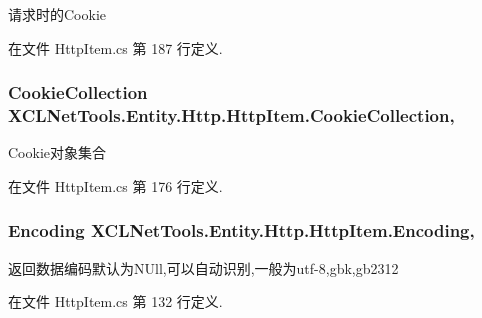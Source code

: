 请求时的\-Cookie 



在文件 Http\-Item.\-cs 第 187 行定义.

\hypertarget{class_x_c_l_net_tools_1_1_entity_1_1_http_1_1_http_item_a6130bb5eec4b2b63c195ee5ae2c9bbfd}{
\subsubsection[{Cookie\-Collection}]{\setlength{\rightskip}{0pt plus 5cm}Cookie\-Collection X\-C\-L\-Net\-Tools.\-Entity.\-Http.\-Http\-Item.\-Cookie\-Collection\hspace{0.3cm}{\ttfamily [get]}, {\ttfamily [set]}}}\label{class_x_c_l_net_tools_1_1_entity_1_1_http_1_1_http_item_a6130bb5eec4b2b63c195ee5ae2c9bbfd}


Cookie对象集合 



在文件 Http\-Item.\-cs 第 176 行定义.

\hypertarget{class_x_c_l_net_tools_1_1_entity_1_1_http_1_1_http_item_aefaad52c96c7c2b692f3470b61cd75eb}{
\subsubsection[{Encoding}]{\setlength{\rightskip}{0pt plus 5cm}Encoding X\-C\-L\-Net\-Tools.\-Entity.\-Http.\-Http\-Item.\-Encoding\hspace{0.3cm}{\ttfamily [get]}, {\ttfamily [set]}}}\label{class_x_c_l_net_tools_1_1_entity_1_1_http_1_1_http_item_aefaad52c96c7c2b692f3470b61cd75eb}


返回数据编码默认为\-N\-Ull,可以自动识别,一般为utf-\/8,gbk,gb2312 



在文件 Http\-Item.\-cs 第 132 行定义.

